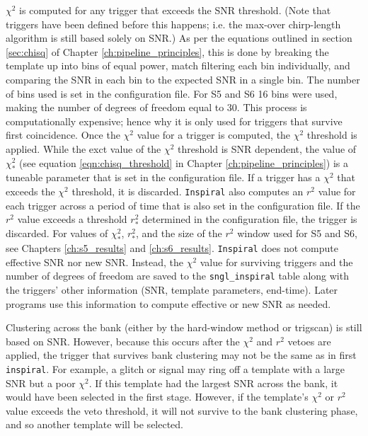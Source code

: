 $\chi^2$ is computed for any trigger that exceeds the \ac{SNR} threshold. (Note that triggers have been defined before this happens; i.e. the max-over chirp-length algorithm is still based solely on \ac{SNR}.) As per the equations outlined in section \ref{sec:chisq} of Chapter \ref{ch:pipeline_principles}, this is done by breaking the template up into bins of equal power, match filtering each bin individually, and comparing the \ac{SNR} in each bin to the expected \ac{SNR} in a single bin. The number of bins used is set in the configuration file. For \ac{S5} and \ac{S6} 16 bins were used, making the number of degrees of freedom equal to 30. This process is computationally expensive; hence why it is only used for triggers that survive first coincidence. Once the $\chi^2$ value for a trigger is computed, the $\chi^2$ threshold is applied. While the exct value of the $\chi^2$ threshold is \ac{SNR} dependent, the value of $\chi_*^2$ (see equation \ref{eqn:chisq_threshold} in Chapter \ref{ch:pipeline_principles}) is a tuneable parameter that is set in the configuration file. If a trigger has a $\chi^2$ that exceeds the $\chi^2$ threshold, it is discarded. \texttt{Inspiral} also computes an $r^2$ value for each trigger across a period of time that is also set in the configuration file. If the $r^2$ value exceeds a threshold $r_*^2$ determined in the configuration file, the trigger is discarded. For values of $\chi_*^2$, $r_*^2$, and the size of the $r^2$ window used for \ac{S5} and \ac{S6}, see Chapters \ref{ch:s5_results} and \ref{ch:s6_results}. \texttt{Inspiral} does not compute effective \ac{SNR} nor new \ac{SNR}. Instead, the $\chi^2$ value for surviving triggers and the number of degrees of freedom are saved to the \texttt{sngl\_inspiral} table along with the triggers' other information (\ac{SNR}, template parameters, end-time). Later programs use this information to compute effective or new \ac{SNR} as needed.

Clustering across the bank (either by the hard-window method or trigscan) is still based on \ac{SNR}. However, because this occurs after the $\chi^2$ and $r^2$ vetoes are applied, the trigger that survives bank clustering may not be the same as in first \texttt{inspiral}. For example, a glitch or signal may ring off a template with a large \ac{SNR} but a poor $\chi^2$. If this template had the largest \ac{SNR} across the bank, it would have been selected in the first stage. However, if the template's $\chi^2$ or $r^2$ value exceeds the veto threshold, it will not survive to the bank clustering phase, and so another template will be selected. 

